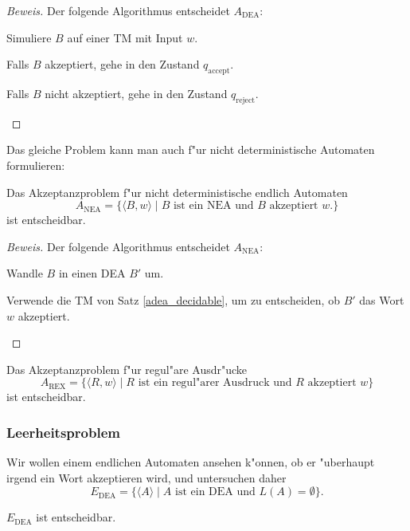 \begin{proof}[Beweis]
Der folgende Algorithmus entscheidet
$A_{\text{DEA}}$:
\medskip
\begin{compactenum}
\item Simuliere $B$ auf einer TM mit Input $w$.
\item Falls $B$ akzeptiert, gehe in den Zustand $q_{\text{accept}}$.
\item Falls $B$ nicht akzeptiert, gehe in den Zustand $q_{\text{reject}}$.
\end{compactenum}
\medskip
\end{proof}

Das gleiche Problem kann man auch f"ur nicht deterministische Automaten
formulieren:

\begin{satz}
Das Akzeptanzproblem f"ur nicht deterministische endlich Automaten
\[
A_{\text{NEA}} =\{
\langle B,w\rangle\;|\;\text{$B$ ist ein NEA und $B$ akzeptiert $w$}.
\}
\]
ist entscheidbar.
\end{satz}

\begin{proof}[Beweis]
Der folgende Algorithmus entscheidet 
$A_{\text{NEA}}$:
\medskip
\begin{compactenum}
\item Wandle $B$ in einen DEA $B'$ um.
\item Verwende die TM von Satz \ref{adea_decidable}, um zu
entscheiden, ob $B'$ das Wort $w$ akzeptiert.
\end{compactenum}
\medskip
\end{proof}

\begin{satz} Das Akzeptanzproblem f"ur regul"are Ausdr"ucke
\[
A_{\text{REX}}=\{
\langle R,w\rangle\;|\;\text{$R$ ist ein regul"arer Ausdruck und $R$ akzeptiert $w$}
\}
\]
ist entscheidbar.
\end{satz}

\subsubsection{Leerheitsproblem}
Wir wollen einem endlichen Automaten ansehen k"onnen, ob er "uberhaupt
irgend ein Wort akzeptieren wird, und untersuchen daher
\[
E_{\text{DEA}}
=\{
\langle A\rangle \;|\;\text{$A$  ist ein DEA und $L(A)=\emptyset$}
\}.
\]
\begin{satz}
$E_{\text{DEA}}$
ist entscheidbar.
\end{satz}

